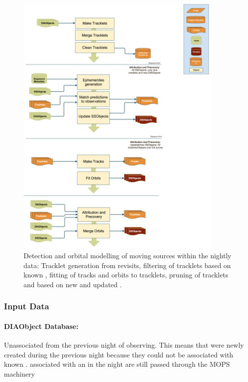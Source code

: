 \begin{figure}[th]
\begin{center}
\includegraphics[width=0.9\textwidth]{figures/MOPS.png}
\caption{\label{fig:apMOPS} Detection and orbital modelling of moving sources within the nightly data: Tracklet generation from revisits, filtering of tracklets based on  known \SSObjects, fitting of tracks and orbits to tracklets, pruning of tracklets and \DIAObjects based on new and updated \SSObjects.}
\end{center}
\end{figure} 

\subsubsection{Input Data}

\paragraph*{DIAObject Database: } Unassociated \DIASources from the previous night of observing.  This means \DIAObjects that were newly created during the previous night because they could not be associated with known \DIAObjects.  \DIASources associated with an \SSObject in the night are still passed through the MOPS machinery

